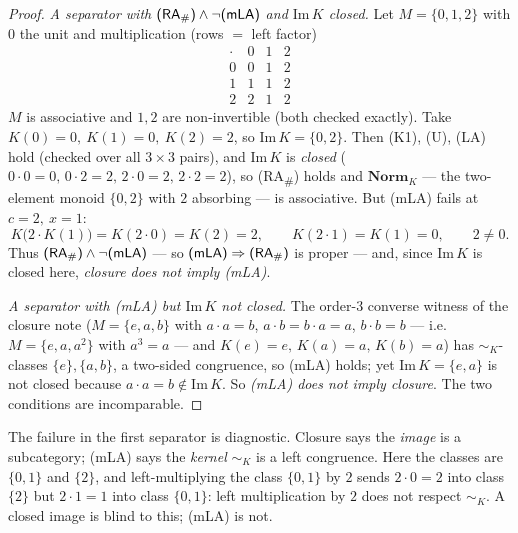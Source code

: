 \documentclass[11pt]{amsart}
\theoremstyle{plain}
\theoremstyle{definition}
\theoremstyle{remark}
\newcommand{\Norm}{\mathbf{Norm}}
\newcommand{\Img}{\mathrm{Im}\,}
\newcommand{\LA}{\textsf{(LA)}}
\newcommand{\mLA}{\textsf{(mLA)}}
\newcommand{\RA}{\textsf{(RA}\textsubscript{\#}\textsf{)}}
\newcommand{\simK}{\mathrel{\sim_{K}}}
\begin{document}
\begin{proof}
\emph{A separator with $\RA{}\wedge\neg\mLA{}$ and $\Img K$ closed.} Let $M=\{0,1,2\}$ with $0$ the
unit and multiplication (rows $=$ left factor)
\[
  \begin{array}{c|ccc}
    \cdot & 0 & 1 & 2\\\hline
    0 & 0 & 1 & 2\\
    1 & 1 & 1 & 2\\
    2 & 2 & 1 & 2
  \end{array}
\]
$M$ is associative and $1,2$ are non-invertible (both checked exactly). Take
$K(0)=0,\ K(1)=0,\ K(2)=2$, so $\Img K=\{0,2\}$. Then \textsf{(K1)}, \textsf{(U)}, \LA{} hold
(checked over all $3\times3$ pairs), and $\Img K$ is \emph{closed}
($0\cdot0=0,\,0\cdot2=2,\,2\cdot0=2,\,2\cdot2=2$), so \RA{} holds and $\Norm_K$ --- the two-element
monoid $\{0,2\}$ with $2$ absorbing --- is associative. But \mLA{} fails at $c=2,\ x=1$:
\[
  K\big(2\cdot K(1)\big)=K(2\cdot0)=K(2)=2,\qquad K(2\cdot1)=K(1)=0,\qquad 2\ne0.
\]
Thus $\RA{}\wedge\neg\mLA{}$ --- so $\mLA{}\Rightarrow\RA{}$ is proper --- and, since $\Img K$ is
closed here, \emph{closure does not imply \mLA{}}.

\emph{A separator with \mLA{} but $\Img K$ not closed.} The order-$3$ converse witness of the closure
note ($M=\{e,a,b\}$ with $a\cdot a=b$, $a\cdot b=b\cdot a=a$, $b\cdot b=b$ --- i.e.\ $M=\{e,a,a^2\}$
with $a^3=a$ --- and $K(e)=e,\,K(a)=a,\,K(b)=a$)
has $\simK$-classes $\{e\},\{a,b\}$, a two-sided congruence, so \mLA{} holds; yet
$\Img K=\{e,a\}$ is not closed because $a\cdot a=b\notin\Img K$. So \emph{\mLA{} does not imply
closure}. The two conditions are incomparable.
\end{proof}

The failure in the first separator is diagnostic. Closure says the \emph{image} is a subcategory;
\mLA{} says the \emph{kernel} $\simK$ is a left congruence. Here the classes are $\{0,1\}$ and $\{2\}$,
and left-multiplying the class $\{0,1\}$ by $2$ sends $2\cdot0=2$ into class $\{2\}$ but $2\cdot1=1$
into class $\{0,1\}$: left multiplication by $2$ does not respect $\simK$. A closed image is blind to
this; \mLA{} is not.
\end{document}
